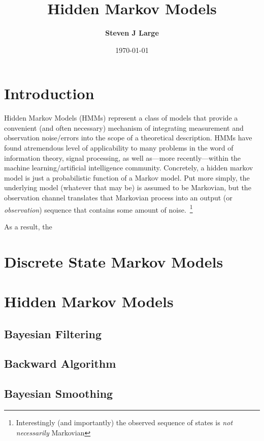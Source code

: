 \documentclass{article}
\title{\tga Hidden Markov Models}
\author{\bf \tga Steven J Large}
\date{\today}
\begin{document}
\maketitle
\tableofcontents
\pagebreak

\twocolumn
\sloppy

\section{Introduction}

Hidden Markov Models (HMMs) represent a class of models that provide a convenient (and often necessary) mechanism of integrating measurement and observation noise/errors into the scope of a theoretical description. HMMs have found atremendous level of applicability to many problems in the word of information theory, signal processing, as well as---more recently---within the machine learning/artificial intelligence community. Concretely, a hidden markov model is just a probabilistic function of a Markov model. Put more simply, the underlying model (whatever that may be) is assumed to be Markovian, but the observation channel translates that Markovian process into an output (or \emph{observation}) sequence that contains some amount of noise.~\footnote{Interestingly (and importantly) the observed sequence of states is \emph{not necessarily} Markovian}

As a result, the 


\section{Discrete State Markov Models}

\section{Hidden Markov Models}

\subsection{Bayesian Filtering}

\subsection{Backward Algorithm}

\subsection{Bayesian Smoothing}
\end{document}
